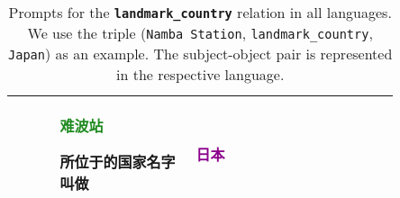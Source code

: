 \begin{table*}[htbp]
\begin{center}
\begin{tabular}{m{0.10\linewidth} p{0.30\linewidth} p{0.30\linewidth} m{0.15\linewidth}}
    & \textcolor{forestgreen}{\begin{CJK}{UTF8}{gbsn}难波站\end{CJK}}\begin{CJK}{UTF8}{gbsn}所位于的国家名字叫做\end{CJK}
    & {\centering \textcolor{darkmagenta}{\begin{CJK}{UTF8}{gbsn}日本\end{CJK}}} \\
\bottomrule
\end{tabular}
\end{center}
\caption{Prompts for the \textbf{\texttt{landmark\_country}} relation in all languages. We use the triple (\texttt{Namba Station}, \texttt{landmark\_country}, \texttt{Japan}) as an example. The subject-object pair is represented in the respective language.}
\label{tab:prompts_landmark_country}
\end{table*}

